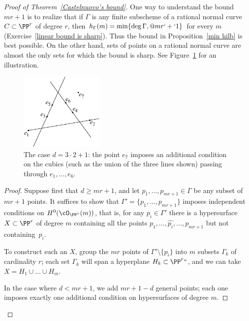 \begin{proof}[Proof of Theorem~\ref{Castelnuovo's bound}]
One way to understand the bound $mr+1$ is to realize that if $\Gamma$
is any finite subscheme of a rational normal curve $C\subset\PP^r$
of degree $r$,
then $h_\Gamma(m) = \min\{\deg \Gamma,@ mr`+`1\}$ for every $m$
(Exercise~\ref{linear bound is sharp}).
  Thus the bound in Proposition~\ref{min hilb} is best possible.
On the other hand, sets of points on a rational normal curve are almost
the only sets for which the bound is sharp. See Figure~\ref{Fig9.3}
for an illustration.

\begin{figure}
\centerline {\includegraphics[height=1.5in]{"main/Fig09-3"}}
\caption{The case $d = 3\cdot 2+1$: the point $e_{7}$ imposes an additional
condition on the cubics (such as the union of the three lines shown)
passing through
$e_{1},\dots, e_{6}$.}
\label{Fig9.3}
\end{figure}

\begin{proof}
Suppose first that $d \geq mr+1$, and let $p_1,\dots,p_{mr+1} \in
\Gamma$ be any subset of $mr+1$ points. It suffices to show that
$\Gamma' = \{p_1,\dots,p_{mr+1}\}$ imposes independent conditions 
on
$H^0(\cO_{\PP^r}(m))$, that is, for any $p_i \in \Gamma'$ there is a
hypersurface $X \subset \PP^r$ of degree $m$ containing all the points
$p_1,\dots, \hat{p_i},\dots,p_{mr+1}$ but not containing~$p_i$.

To construct such an $X$, group the $mr$ points of $\Gamma' \setminus
\{p_i\}$ into $m$ subsets $\Gamma_k$ of cardinality $r$; each set
$\Gamma_k$ will span a hyperplane $H_k \subset \PP^r` `$, and we can
take $X = H_1 \cup \dots \cup H_m$.

In the case where $d<mr+1$, we add $mr+1-d$ general points; each one
imposes exactly one
additional condition on hypersurfaces of degree $m$.
\end{proof}



\end{proof}
